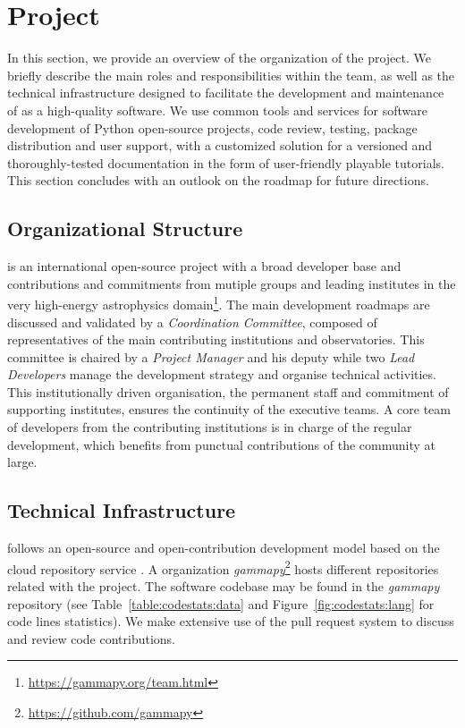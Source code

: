 \documentclass[traditabstract, longauth]{aa}
\begin{document}
\section{\gammapy Project} \label{sec:gammapy-project}

In this section, we provide an overview of the organization of the \gammapy
project. We briefly describe the main roles and responsibilities within the
team, as well as the technical infrastructure designed to facilitate the
development and maintenance of \gammapy as a high-quality software. We use
common tools and services for software development of Python open-source
projects, code review, testing, package distribution and user support, with a
customized solution for a versioned and thoroughly-tested documentation in the form
of user-friendly playable tutorials. This section concludes with an outlook on
the roadmap for future directions.

\subsection{Organizational Structure}
\label{ssec:organizational-structure}

\gammapy is an international open-source project with a broad
developer base and contributions and commitments from mutiple groups and
leading institutes in the very high-energy astrophysics
domain\footnote{\url{https://gammapy.org/team.html}}. The main development
roadmaps are discussed and validated by a \textit{Coordination Committee}, composed of
representatives of the main contributing institutions and observatories.
This committee is
chaired by a \textit{Project Manager} and his deputy while two \textit{Lead Developers} manage
the development strategy and organise technical activities. This
institutionally driven organisation, the permanent staff and commitment of
supporting institutes, ensures the continuity of the executive teams. A core team
of developers from the contributing institutions is in charge of the regular
development, which benefits from punctual contributions of the community at
large.

\subsection{Technical Infrastructure}
\label{ssec:technical-infrastructure}

\gammapy follows an open-source and open-contribution development model based on
the cloud repository service \github. A \github organization
\textit{gammapy}\footnote{\url{https://github.com/gammapy}} hosts different
repositories related with the project. The software codebase may be found in
the \textit{gammapy} repository (see Table~\ref{table:codestats:data} and
Figure~\ref{fig:codestats:lang} for code lines statistics). We make extensive
use of the pull request system to discuss and review code contributions.
\end{document}
